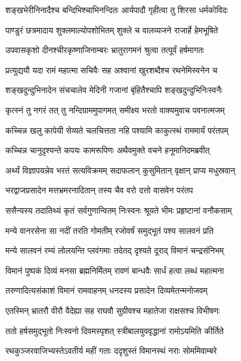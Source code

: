 \twolineshloka
{शङ्खभेरीनिनादैश्च बन्दिभिश्चाभिनन्दितः}
{आर्यपादौ गृहीत्वा तु शिरसा धर्मकोविदः} %

\twolineshloka
{पाण्डुरं छत्रमादाय शुक्लमाल्योपशोभितम्}
{शुक्ले च वालव्यजने राजार्हे हेमभूषिते} %

\twolineshloka
{उपवासकृशो दीनश्चीरकृष्णाजिनाम्बरः}
{भ्रातुरागमनं श्रुत्वा तत्पूर्वं हर्षमागतः} %

\twolineshloka
{प्रत्युद्ययौ यदा रामं महात्मा सचिवैः सह}
{अश्वानां खुरशब्दैश्च रथनेमिस्वनेन च} %

\twolineshloka
{शङ्खदुन्दुभिनादेन संचचालेव मेदिनी}
{गजानां बृंहितैश्चापि शङ्खदुन्दुभिनिःस्वनैः} %

\twolineshloka
{कृत्स्नं तु नगरं तत् तु नन्दिग्राममुपागमत्}
{समीक्ष्य भरतो वाक्यमुवाच पवनात्मजम्} %

\twolineshloka
{कच्चिन्न खलु कापेयी सेव्यते चलचित्तता}
{नहि पश्यामि काकुत्स्थं राममार्यं परंतपम्} %

\twolineshloka
{कच्चिन्न चानुदृश्यन्ते कपयः कामरूपिणः}
{अथैवमुक्ते वचने हनूमानिदमब्रवीत्} %

\twolineshloka
{अर्थ्यं विज्ञापयन्नेव भरतं सत्यविक्रमम्}
{सदाफलान् कुसुमितान् वृक्षान् प्राप्य मधुस्रवान्} %

\twolineshloka
{भरद्वाजप्रसादेन मत्तभ्रमरनादितान्}
{तस्य चैव वरो दत्तो वासवेन परंतप} %

\twolineshloka
{ससैन्यस्य तदातिथ्यं कृतं सर्वगुणान्वितम्}
{निःस्वनः श्रूयते भीमः प्रहृष्टानां वनौकसाम्} %

\twolineshloka
{मन्ये वानरसेना सा नदीं तरति गोमतीम्}
{रजोवर्षं समुद्भूतं पश्य सालवनं प्रति} %

\twolineshloka
{मन्ये सालवनं रम्यं लोलयन्ति प्लवंगमाः}
{तदेतद् दृश्यते दूराद् विमानं चन्द्रसंनिभम्} %

\twolineshloka
{विमानं पुष्पकं दिव्यं मनसा ब्रह्मनिर्मितम्}
{रावणं बान्धवैः सार्धं हत्वा लब्धं महात्मना} %

\twolineshloka
{तरुणादित्यसंकाशं विमानं रामवाहनम्}
{धनदस्य प्रसादेन दिव्यमेतन्मनोजवम्} %

\twolineshloka
{एतस्मिन् भ्रातरौ वीरौ वैदेह्या सह राघवौ}
{सुग्रीवश्च महातेजा राक्षसश्च विभीषणः} %

\twolineshloka
{ततो हर्षसमुद्भूतो निःस्वनो दिवमस्पृशत्}
{स्त्रीबालयुववृद्धानां रामोऽयमिति कीर्तिते} %

\twolineshloka
{रथकुञ्जरवाजिभ्यस्तेऽवतीर्य महीं गताः}
{ददृशुस्तं विमानस्थं नराः सोममिवाम्बरे} %

